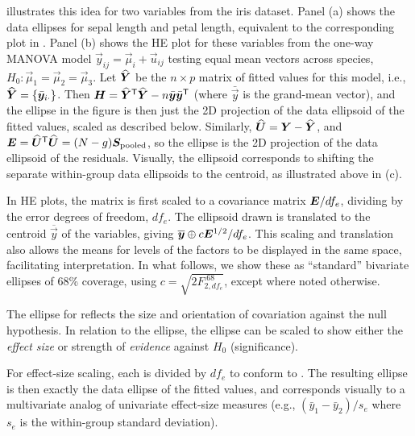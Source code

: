  illustrates this idea for two variables from the iris dataset.
Panel (a) shows the data ellipses for sepal length and petal length, equivalent to
the corresponding plot in . Panel (b) shows the HE plot for these
variables from the one-way MANOVA model $\vec{y}_{ij} = \vec{\mu}_i + \vec{u}_{ij}$
testing equal mean vectors across species, $H_0: \vec{\mu}_1 = \vec{\mu}_2 = \vec{\mu}_3$.
Let $\widehat{\bm{Y}}$ be the $n \times p$ matrix of fitted values for this model,
i.e., $\widehat{\bm{Y}} = \{ \bar{\bm{y}}_{i \cdot} \}$.
Then $\bm{H}= \widehat{\bm{Y}}^\mathsf{T} \widehat{\bm{Y}} - n\bar{\bm{y}} \bar{\bm{y}}^\mathsf{T} $ (where $\bar{\vec{y}}$ is the grand-mean vector), and the  ellipse in the figure is then just the
2D projection of the data ellipsoid
of the fitted values, scaled as described below.
Similarly, $\widehat{\bm{U}} = \bm{Y} - \widehat{\bm{Y}}$, and
$\bm{E} = \widehat{\bm{U}}^\mathsf{T}  \widehat{\bm{U}} = (N-g) \bm{S}_{\mathrm{pooled}}$, so the  ellipse is
the 2D projection of the data ellipsoid of the residuals.
Visually, the  ellipsoid corresponds to shifting the separate within-group data ellipsoids to the centroid,
as illustrated above in (c).

In HE plots, the  matrix is first scaled to a covariance matrix
$\bm{E}/df_e$, dividing by the error degrees of freedom, $df_e$.
The ellipsoid drawn is
translated to the centroid $\overline{\vec{y}}$ of the variables,
giving $\overline{\bm{y}} \oplus c \bm{E}^{1/2}/df_e$.
This scaling and translation
also allows the means for levels of the factors
to be displayed in the same space,
facilitating interpretation.
In what follows, we show these as
``standard'' bivariate ellipses of 68\% coverage,
using $c=\sqrt{2 F_{2, df_e}^{.68}}$, except where noted otherwise.

The ellipse for  reflects the size and orientation of covariation
against the null hypothesis.
In relation to the  ellipse, the  ellipse
can be scaled to show either the \emph{effect size} or strength of
\emph{evidence} against $H_0$ (significance).

For effect-size scaling, each  is divided by $df_e$ to conform
to .  The resulting ellipse is then exactly the data ellipse
of the fitted values, and corresponds visually to a multivariate analog of
univariate effect-size measures (e.g., $(\bar{y}_1 - \bar{y}_2)/s_e$
where $s_e$ is the within-group standard deviation).

